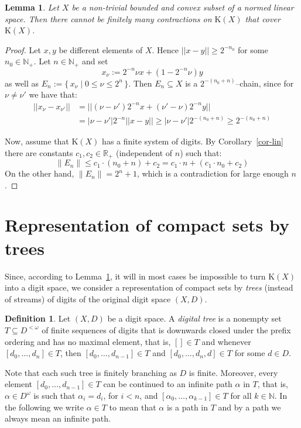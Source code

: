 \documentclass[microtype]{jloganal}
\theoremstyle{plain}
\newtheorem{lemma}[theorem]{Lemma}
\theoremstyle{definition}
\newtheorem{definition}[theorem]{Definition}
\newcommand{\NN}{\mathbb{N}}
\newcommand{\compact}{\mathrm{K}}
\newcommand{\card}[1]{\mathopen\parallel #1 \mathclose\parallel}
\begin{document}
\begin{lemma}
\label{lem-convex}
Let $X$ be a non-trivial bounded and convex subset of a normed linear space.
Then there cannot be finitely many contractions on $\compact(X)$ that 
cover $\compact(X)$.
\end{lemma}
\begin{proof}
Let $x, y$ be different elements of $X$. Hence $|| x - y || \ge 2^{-n_0}$
for some $n_0 \in \mathbb{N}_+$. Let $n \in \mathbb{N}_+$ and set 
\[
x_\nu :=  2^{-n}  \nu x + (1 - 2^{-n}  \nu) y
\]
as well as $E_n := \{\, x_\nu \mid 0 \le \nu \le 2^n \,\}$. Then $E_n \subseteq X$
is a $2^{-(n_0 + n)}$--chain, since for $\nu \not= \nu'$ we 
have that:
\begin{align*}
|| x_\nu - x_{\nu'} || &= || (\nu - \nu') 2^{-n} x + (\nu' - \nu) 2^{-n} y || \\
& = |\nu - \nu'| 2^{-n} ||x - y|| \ge |\nu - \nu'| 2^{-(n_0 + n)} \ge 2^{-(n_0 + n)}
\end{align*}

Now, assume that $\compact(X)$ has a finite system of digits. 
By Corollary~\ref{cor-lin} there are constants $c_1, c_2 \in \mathbb{R}_+$ 
(independent of $n$) such that:
\[
\card{E_n} \le c_1 \cdot (n_0 + n) + c_2 = c_1 \cdot n + (c_1 \cdot n_0 + c_2)
\]
On the other hand, $\card{E_n} = 2^n + 1$, which is a contradiction for
large enough $n$.
\end{proof}

\section{Representation of compact sets by trees} 
\label{sec-tree}
Since, according to Lemma~\ref{lem-convex}, it will in most cases be 
impossible to turn $\compact(X)$ into a digit space, we consider a 
representation of compact sets by \emph{trees} (instead of streams) 
of digits of the original digit space $(X,D)$.
\begin{definition}
\label{def-tree}
Let $(X,D)$ be a digit space. A \emph{digital tree} is a nonempty set 
$T\subseteq D^{<\omega}$ of finite sequences of digits that 
is downwards closed under the prefix ordering and has no maximal element, that is,
$[]\in T$ and whenever
$[d_0,\ldots,d_{n}]\in T$, then $[d_0,\ldots,d_{n-1}]\in T$ and
$[d_0,\ldots,d_{n},d]\in T$ for some $d\in D$.
\end{definition}
Note that each such tree is finitely branching as $D$ is finite.
Moreover, every element $[d_0,\ldots,d_{n-1}]\in T$ can be continued to an 
infinite path $\alpha$ in $T$, that is, $\alpha \in D^\omega$ is such that $\alpha_i = d_i$, for $i < n$, and 
$[\alpha_0,\ldots,\alpha_{k-1}]\in T$ for all $k\in\NN$.
In the following we write  $\alpha\in T$ to mean that $\alpha$ is a 
path in $T$ and by a path we always mean an infinite path.
\end{document}
